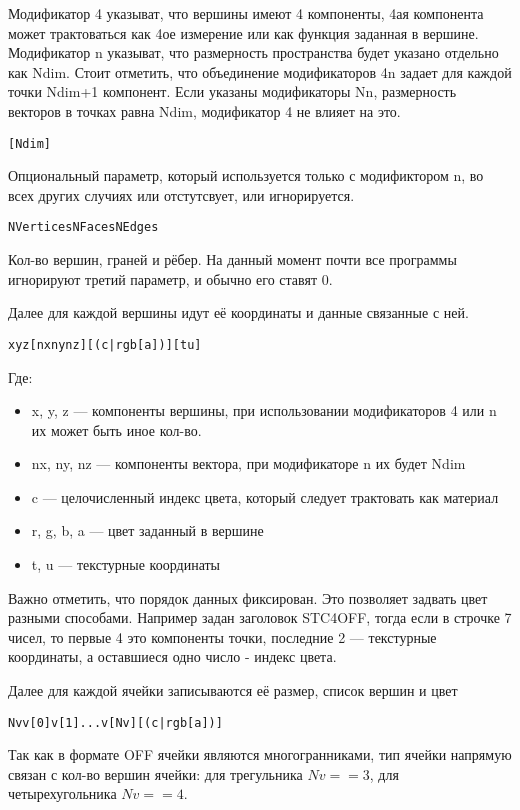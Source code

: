 \documentclass[a4paper,12pt]{article}
\begin{document}
Модификатор 4 указыват, что вершины имеют 4 компоненты, 4ая компонента может трактоваться как 4ое измерение или как функция заданная в вершине. Модификатор n указыват, что размерность пространства будет указано отдельно как Ndim. Стоит отметить, что объединение модификаторов 4n задает для каждой точки Ndim+1 компонент. Если указаны модификаторы Nn, размерность векторов в точках равна Ndim, модификатор 4 не влияет на это.

\begin{alltt}
[Ndim]
\end{alltt}
Опциональный параметр, который используется только с модификтором n, во всех других случиях или отстутсвует, или игнорируется.

\begin{alltt}
NVertices  NFaces  NEdges
\end{alltt}
Кол-во вершин, граней и рёбер. На данный момент почти все программы игнорируют третий параметр, и обычно его ставят 0.

Далее для каждой вершины идут её координаты и данные связанные с ней.
\begin{alltt}
x y z [nx ny nz] [( c | r g b [a] )] [ t u ]
\end{alltt}
Где:
\begin{itemize}
\item x, y, z --- компоненты вершины, при использовании модификаторов 4 или n их может быть иное кол-во.
\item nx, ny, nz ---  компоненты вектора, при модификаторе n их будет Ndim
\item c --- целочисленный индекс цвета, который следует трактовать как материал
\item r, g, b, a --- цвет заданный в вершине
\item t, u --- текстурные координаты
\end{itemize}

Важно отметить, что порядок данных фиксирован. Это позволяет задвать цвет разными способами. Например задан заголовок STC4OFF, тогда если в строчке 7 чисел, то первые 4 это компоненты точки, последние 2 --- текстурные координаты, а оставшиеся одно число - индекс цвета.

Далее для каждой ячейки записываются её размер, список вершин и цвет
\begin{alltt}
Nv v[0] v[1] ... v[Nv] [( c | r g b [a] )]
\end{alltt}

Так как в формате OFF ячейки являются многогранниками, тип ячейки напрямую связан с кол-во вершин ячейки: для трегульника $Nv==3$, для четырехугольника $Nv==4$.
\end{document}
